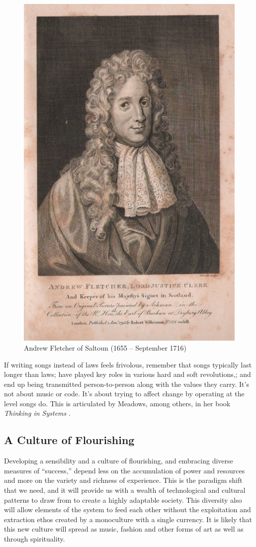 \begin{figure}[h]
 \centering
 \includegraphics[width=.5\textwidth]{pictures/fletcher.eps}
 \caption{Andrew Fletcher of Saltoun (1655 -- September 1716)}
 \label{fig:fletcher}
\end{figure}

If writing songs instead of laws feels frivolous, remember that songs typically last longer than laws; have played key roles in various hard and soft revolutions,; and end up being transmitted person-to-person along with the values they carry. It's not about music or code. It's about trying to affect change by operating at the level songs do. This is articulated by Meadows, among others, in her book \textit{Thinking in Systems} \cite{meadows2008thinking}.

\subsection{A Culture of Flourishing}
\label{sec:cultureflourish}

Developing a sensibility and a culture of flourishing, and embracing diverse measures of ``success,'' depend less on the accumulation of power and resources and more on the variety and richness of experience. This is the paradigm shift that we need, and it will provide us with a wealth of technological and cultural patterns to draw from to create a highly adaptable society. This diversity also will allow elements of the system to feed each other without the exploitation and extraction ethos created by a monoculture with a single currency. It is likely that this new culture will spread as music, fashion and other forms of art as well as through spirituality.

